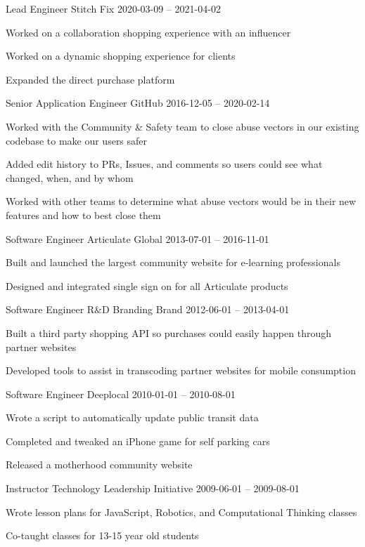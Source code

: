 \documentclass[]{awesome-cv}
\begin{document}
\vspace{-2mm}
\begin{cventries}
	\cventry
	{Lead Engineer}
	{Stitch Fix}
	{}
	{2020-03-09 – 2021-04-02}
	{\begin{cvitems}
		\item {Worked on a collaboration shopping experience with an influencer}
		\item {Worked on a dynamic shopping experience for clients}
		\item {Expanded the direct purchase platform}
		\end{cvitems}}
	\cventry
	{Senior Application Engineer}
	{GitHub}
	{}
	{2016-12-05 – 2020-02-14}
	{\begin{cvitems}
		\item {Worked with the Community \& Safety team to close abuse vectors in our existing codebase to make our users safer}
		\item {Added edit history to PRs, Issues, and comments so users could see what changed, when, and by whom}
		\item {Worked with other teams to determine what abuse vectors would be in their new features and how to best close them}
		\end{cvitems}}
	\cventry
	{Software Engineer}
	{Articulate Global}
	{}
	{2013-07-01 – 2016-11-01}
	{\begin{cvitems}
		\item {Built and launched the largest community website for e-learning professionals}
		\item {Designed and integrated single sign on for all Articulate products}
		\end{cvitems}}
	\cventry
	{Software Engineer R\&D}
	{Branding Brand}
	{}
	{2012-06-01 – 2013-04-01}
	{\begin{cvitems}
		\item {Built a third party shopping API so purchases could easily happen through partner websites}
		\item {Developed tools to assist in \textquotedbl{}transcoding\textquotedbl{} partner websites for mobile consumption}
		\end{cvitems}}
	\cventry
	{Software Engineer}
	{Deeplocal}
	{}
	{2010-01-01 – 2010-08-01}
	{\begin{cvitems}
		\item {Wrote a script to automatically update public transit data}
		\item {Completed and tweaked an iPhone game for self parking cars}
		\item {Released a motherhood community website}
		\end{cvitems}}
	\cventry
	{Instructor}
	{Technology Leadership Initiative}
	{}
	{2009-06-01 – 2009-08-01}
	{\begin{cvitems}
		\item {Wrote lesson plans for JavaScript, Robotics, and Computational Thinking classes}
		\item {Co-taught classes for 13-15 year old students}
		\end{cvitems}}
\end{cventries}
\end{document}
